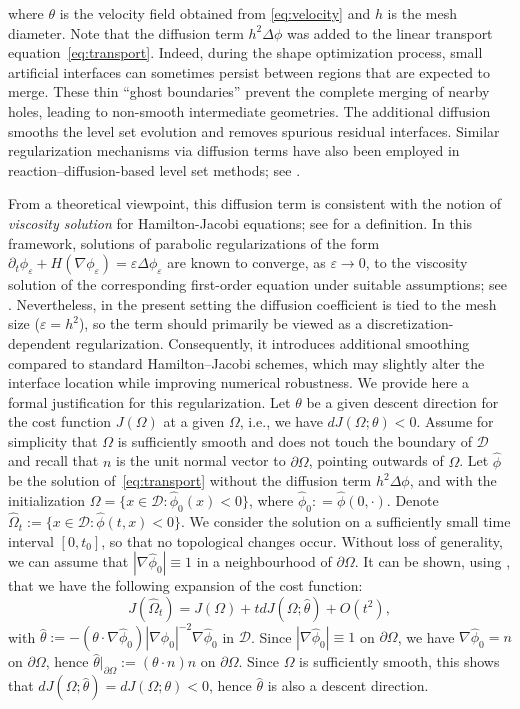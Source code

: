\documentclass[preprint,9pt]{elsarticle}
\newcommand{\Om}{\Omega}
\begin{document}
{\color{blue}
where $\theta$ is the velocity field obtained from \eqref{eq:velocity}
and $h$ is the mesh diameter.
Note that the diffusion term $h^2\Delta\phi$ was added to
the linear transport equation~\eqref{eq:transport}.
Indeed, during the shape optimization process, small artificial interfaces
can sometimes persist between regions that are expected to merge.
These thin ``ghost boundaries'' prevent the complete merging of nearby holes,
leading to non-smooth intermediate geometries.
The additional diffusion smooths the level set evolution
and removes spurious residual interfaces.
Similar regularization mechanisms  via diffusion terms have also been employed in
reaction--diffusion-based level set methods; see \cite{YAMADA20102876}. 


From a theoretical viewpoint, this diffusion term  is consistent with the notion of {\it viscosity solution} for Hamilton-Jacobi equations; see \cite{MR732102} for a definition.  In this framework, solutions of parabolic
regularizations of the form
$\partial_t \phi_\varepsilon + H(\nabla \phi_\varepsilon) = \varepsilon \Delta \phi_\varepsilon$
are known to converge, as $\varepsilon \to 0$, to the viscosity solution
of the corresponding first-order equation under suitable assumptions;
see \cite[Theorem~3.1]{MR732102}. 
%
Nevertheless, in the present setting the diffusion coefficient is tied
to the mesh size ($\varepsilon = h^2$), so the term should primarily be
viewed as a discretization-dependent regularization. Consequently, it
introduces additional smoothing compared to standard Hamilton--Jacobi
schemes, which may slightly alter the interface location while improving
numerical robustness.
We provide here a formal justification for this regularization.
Let $\theta$ be a given descent direction for the cost function $J(\Om)$ at a given $\Om$, i.e., we have $dJ(\Om;\theta)<0$.
Assume for simplicity that $\Om$ is sufficiently smooth and does not touch the boundary of $\mathcal{D}$  and recall that $n$ is the unit normal vector to $\partial\Om$, pointing outwards of $\Om$. 
Let $\hat\phi$ be the solution of~\eqref{eq:transport} without the diffusion term $h^2\Delta\phi$, and with the initialization $\Om = \{x\in \mathcal{D} : \hat\phi_0(x) < 0\}$, where $\hat\phi_0: = \hat\phi(0,\cdot)$.
 Denote $\widehat\Om_t := \{x\in \mathcal{D} : \hat\phi(t,x) < 0\}$.
 We consider the solution on a sufficiently small time interval $[0,t_0]$, so that no topological changes occur.
 Without loss of generality, we can assume that $|\nabla \hat\phi_0| \equiv 1$ in a neighbourhood of $\partial\Om$.
 It can be shown, using \cite[Theorem~3]{MR3840889}, that we have the following expansion of the cost function:
 $$J(\widehat\Om_t) = J(\Om) + t dJ(\Om;\hat\theta) + O(t^2),$$
 with $\hat\theta:= - (\theta\cdot\nabla \hat\phi_0) |\nabla \hat\phi_0|^{-2}\nabla \hat\phi_0$ in $\mathcal{D}$.
 Since  $|\nabla \hat\phi_0| \equiv 1$ on $\partial\Om$, we have $\nabla \hat\phi_0 = n$ on $\partial\Om$, hence 
 $\hat\theta|_{\partial\Om} := (\theta\cdot n) n$ on $\partial\Om$.
Since $\Om$ is sufficiently smooth,  this shows that $dJ(\Om;\hat\theta) = dJ(\Om;\theta)<0$, hence $\hat\theta$ is also a descent direction.


}
\end{document}

